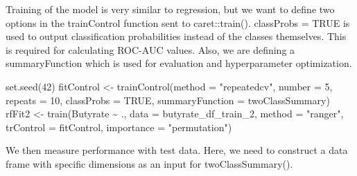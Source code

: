 \documentclass[
  oneside]{book}
\newenvironment{Shaded}{\begin{snugshade}}{\end{snugshade}}
\newcommand{\AttributeTok}[1]{\textcolor[rgb]{0.77,0.63,0.00}{#1}}
\newcommand{\CommentTok}[1]{\textcolor[rgb]{0.56,0.35,0.01}{\textit{#1}}}
\newcommand{\ConstantTok}[1]{\textcolor[rgb]{0.00,0.00,0.00}{#1}}
\newcommand{\DecValTok}[1]{\textcolor[rgb]{0.00,0.00,0.81}{#1}}
\newcommand{\FunctionTok}[1]{\textcolor[rgb]{0.00,0.00,0.00}{#1}}
\newcommand{\NormalTok}[1]{#1}
\newcommand{\OtherTok}[1]{\textcolor[rgb]{0.56,0.35,0.01}{#1}}
\newcommand{\SpecialCharTok}[1]{\textcolor[rgb]{0.00,0.00,0.00}{#1}}
\newcommand{\StringTok}[1]{\textcolor[rgb]{0.31,0.60,0.02}{#1}}
\begin{document}
Training of the model is very similar to regression, but we want to define two options in the
trainControl function sent to caret::train(). classProbs = TRUE is used to output classification
probabilities instead of the classes themselves. This is required for calculating
ROC-AUC values. Also, we are defining a summaryFunction which is used for evaluation
and hyperparameter optimization.

\begin{Shaded}
\begin{Highlighting}[]
\FunctionTok{set.seed}\NormalTok{(}\DecValTok{42}\NormalTok{)}
\NormalTok{fitControl }\OtherTok{\textless{}{-}} \FunctionTok{trainControl}\NormalTok{(}\AttributeTok{method =} \StringTok{"repeatedcv"}\NormalTok{, }\AttributeTok{number =} \DecValTok{5}\NormalTok{, }\AttributeTok{repeats =} \DecValTok{10}\NormalTok{, }\AttributeTok{classProbs =} \ConstantTok{TRUE}\NormalTok{, }\AttributeTok{summaryFunction =}\NormalTok{ twoClassSummary)}
\NormalTok{rfFit2 }\OtherTok{\textless{}{-}} \FunctionTok{train}\NormalTok{(Butyrate }\SpecialCharTok{\textasciitilde{}}\NormalTok{ ., }\AttributeTok{data =}\NormalTok{ butyrate\_df\_train\_2, }
                \AttributeTok{method =} \StringTok{"ranger"}\NormalTok{, }
                \AttributeTok{trControl =}\NormalTok{ fitControl,}
                \AttributeTok{importance =} \StringTok{"permutation"}\NormalTok{)}
\end{Highlighting}
\end{Shaded}

We then measure performance with test data. Here, we need to construct a data frame with
specific dimensions as an input for twoClassSummary().

\begin{Shaded}
\end{Shaded}
\end{document}
